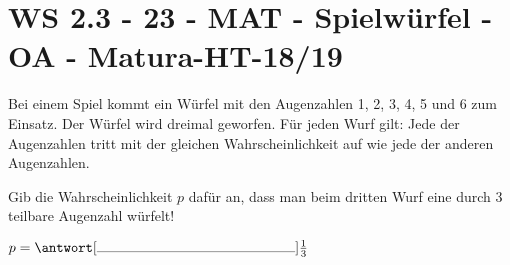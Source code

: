 \section{WS 2.3 - 23 - MAT - Spielwürfel - OA - Matura-HT-18/19}

\begin{beispiel}[WS 2.3]{1}
Bei einem Spiel kommt ein Würfel mit den Augenzahlen 1, 2, 3, 4, 5 und 6 zum Einsatz.
Der Würfel wird dreimal geworfen. Für jeden Wurf gilt: Jede der Augenzahlen tritt mit der gleichen Wahrscheinlichkeit auf wie jede der anderen Augenzahlen.\leer

Gib die Wahrscheinlichkeit $p$ dafür an, dass man beim dritten Wurf eine durch 3 teilbare Augenzahl würfelt!

$p= \antwort[\rule{5cm}{0.3pt}]{\frac{1}{3}}$

\end{beispiel}